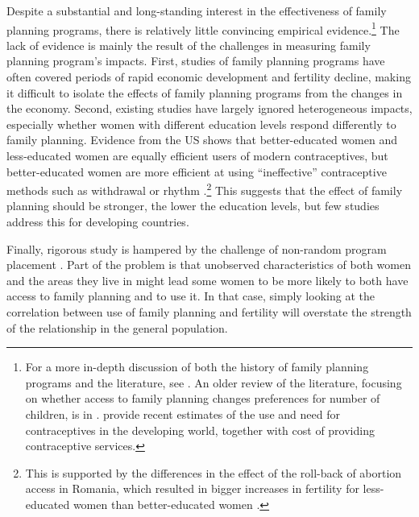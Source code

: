 Despite a substantial and long-standing interest in the effectiveness of family planning programs, there is relatively little convincing empirical evidence.\footnote{For a more in-depth discussion of both the history of family planning programs and the literature, see \citet{Miller2016}. An older review of the literature, focusing on whether access to family planning changes preferences for number of children, is in \citet{Freedman1997}. \citet{Singh2012} provide recent estimates of the use and need for contraceptives in the developing world, together with cost of providing contraceptive services.} The lack of evidence is mainly the result of the challenges in measuring family planning program's impacts. First, studies of family planning programs have often covered periods of rapid economic development and fertility decline, making it difficult to isolate the effects of family planning programs from the changes in the economy. Second, existing studies have largely ignored heterogeneous impacts, especially whether women with different education levels respond differently to family planning. Evidence from the US shows that better-educated women and less-educated women are equally efficient users of modern contraceptives, but better-educated women are more efficient at using ``ineffective'' contraceptive methods such as withdrawal or rhythm \citep{Rosenzweig1989}.\footnote{This is supported by the differences in the effect of the roll-back of abortion access in Romania, which resulted in bigger increases in fertility for less-educated women than better-educated women \citep{Pop-Eleches2010}.} This suggests that the effect of family planning should be stronger, the lower the education levels, but few studies address this for developing countries.

Finally, rigorous study is hampered by the challenge of non-random program placement \citep{rosenzweig86,pitt93,Miller2016}. Part of the problem is that unobserved characteristics of both women and the areas they live in might lead some women to be more likely to both have access to family planning and to use it. In that case, simply looking at the correlation between use of family planning and fertility will overstate the strength of the relationship in the general population.


